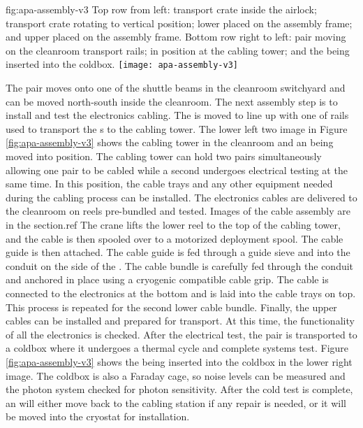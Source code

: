 \begin{dunefigure}{fig:apa-assembly-v3}
  {Top row from left:   transport crate inside the airlock;  transport crate rotating to vertical position;  lower  placed on the  assembly frame; and upper  placed on the assembly frame. Bottom row right to left:  pair moving on the cleanroom transport rails;  in  position at the cabling tower; and the  being inserted into the coldbox.}
\texttt{[image: apa-assembly-v3]}

\end{dunefigure}

The  pair moves onto one of the shuttle beams in the cleanroom switchyard and can be moved north-south inside the cleanroom. The next assembly step is to install and test the electronics cabling. The  is moved to line up with one of rails used to transport the s to the  cabling tower. The lower left two image in Figure \ref{fig:apa-assembly-v3} shows the  cabling tower in the cleanroom and an  being moved into position. The  cabling tower can hold two  pairs simultaneously allowing one  pair to be cabled while a second  undergoes electrical testing at the same time. In this position, the cable trays and any other equipment needed during the cabling process can be installed. The electronics cables are delivered to the cleanroom on reels pre-bundled and tested. Images of the cable assembly are in the  section.ref{} The crane lifts the lower  reel  to the top of the  cabling tower, and the cable is then spooled over to a motorized deployment spool. The cable guide is then attached.  The cable guide is fed through a guide sieve and into the conduit on the side of the . The cable bundle is carefully fed through the conduit and anchored in place using a cryogenic compatible cable grip. The cable is connected to the electronics at the bottom and is laid into the cable trays on top. This process is repeated for the second lower  cable bundle. Finally, the upper cables can be installed and prepared for transport. At this time, the functionality of all the electronics is checked. After the  electrical test, the  pair is transported to a coldbox where it undergoes a thermal cycle and complete systems test. Figure \ref{fig:apa-assembly-v3} shows the  being inserted into the coldbox in the lower right image. The coldbox is also a Faraday cage, so noise levels can be measured and the photon system checked for photon sensitivity. After the cold test is complete, an  will either move back to the cabling station if any repair is needed, or it will be moved into the cryostat for installation. 




